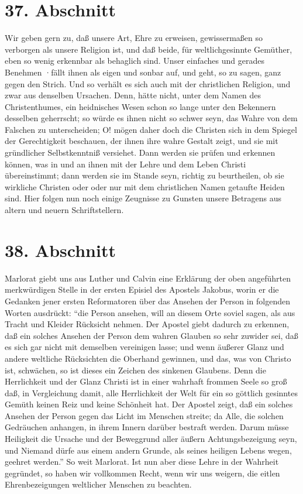 \section{37. Abschnitt}

Wir geben gern zu, daß unsere Art, Ehre zu erweisen, gewissermaßen so verborgen
als unsere Religion ist, und daß beide, für weltlichgesinnte Gemüther, eben so
wenig erkennbar als behaglich sind. Unser einfaches und gerades Benehmen ·fällt
ihnen als eigen und sonbar auf, und geht, so zu sagen, ganz gegen den Strich.
Und so verhält es sich auch mit der christlichen Religion, und zwar aus
denselben Ursachen. Denn, hätte nicht, unter dem Namen des Christenthumes, ein
heidnisches Wesen schon so lange unter den Bekennern desselben geherrscht; so
würde es ihnen nicht so schwer seyn, das Wahre von dem Falschen zu
unterscheiden; O! mögen daher doch die Christen sich in dem Spiegel der
Gerechtigkeit beschauen, der ihnen ihre wahre Gestalt zeigt, und sie mit
gründlicher Selbstkenntniß versiehet. Dann werden sie prüfen und erkennen
können, was in und an ihnen mit der Lehre und dem Leben Christi übereinstimmt;
dann werden sie im Stande seyn, richtig zu beurtheilen, ob sie wirkliche
Christen oder oder nur mit dem christlichen Namen getaufte Heiden sind. Hier
folgen nun noch einige Zeugnisse zu Gunsten unsere Betragens aus altern und
neuern Schriftstellern.

\section{38. Abschnitt}

Marlorat giebt uns aus Luther und Calvin eine Erklärung der oben angeführten
merkwürdigen Stelle in der ersten Episiel des Apostels Jakobus, worin er die
Gedanken jener ersten Reformatoren über das Ansehen der Person in folgenden
Worten ausdrückt: "`die Person ansehen, will an diesem Orte soviel sagen, als
aus Tracht und Kleider Rücksicht nehmen. Der Apostel giebt dadurch zu erkennen,
daß ein solches Ansehen der Person dem wahren Glauben so sehr zuwider sei, daß
es sich gar nicht mit demselben vereinigen lasse; und wenn äußerer Glanz und
andere weltliche Rücksichten die Oberhand gewinnen, und das, was von Christo
ist, schwächen, so ist dieses ein Zeichen des sinkenen Glaubens. Denn die
Herrlichkeit und der Glanz Christi ist in einer wahrhaft frommen Seele so groß
daß, in Vergleichung damit, alle Herrlichkeit der Welt für ein so göttlich
gesinntes Gemüth keinen Reiz und keine Schönheit hat. Der Apostel zeigt, daß ein
solches Ansehen der Person gegen das Licht im Menschen streite; da Alle, die
solchen Gedräuchen anhangen, in ihrem Innern darüber bestraft werden. Darum
müsse Heiligkeit die Ursache und der Beweggrund aller äußern Achtungsbezeigung
seyn, und Niemand dürfe aus einem andern Grunde, als seines heiligen Lebens
wegen, geehret werden."' So weit Marlorat. Ist nun aber diese Lehre in der
Wahrheit gegründet, so haben wir vollkommen Recht, wenn wir uns weigern, die
eitlen Ehrenbezeigungen weltlicher Menschen zu beachten.

